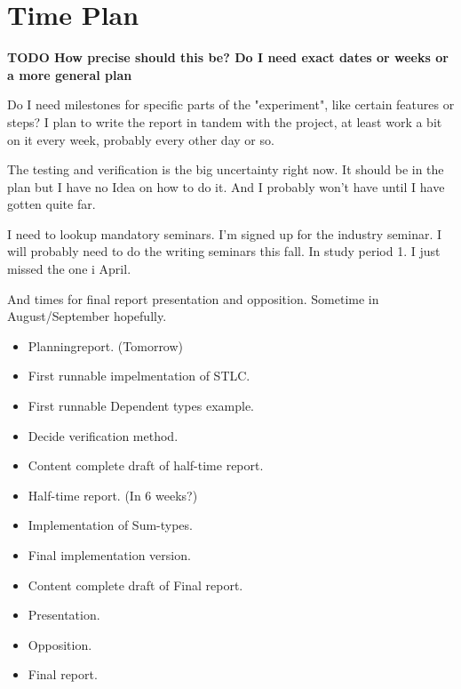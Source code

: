 \documentclass[parskip=half]{scrartcl}
\begin{document}
\section{Time Plan}
\textbf{TODO How precise should this be? Do I need exact dates or weeks or
a more general plan}


Do I need milestones for specific parts of the "experiment", like certain
features or steps? I plan to write the report in tandem with the project, at
least work a bit on it every week, probably every other day or so.

The testing and verification is the big uncertainty right now. It should be in
the plan but I have no Idea on how to do it. And I probably won't have until
I have gotten quite far.


I need to lookup mandatory seminars.
I'm signed up for the industry seminar.
I will probably need to do the writing seminars this fall. In study period 1.
I just missed the one i April.

And times for final report presentation and opposition.
Sometime in August/September hopefully.

\begin{itemize}
  \item Planningreport. (Tomorrow)
  \item First runnable impelmentation of STLC.
  \item First runnable Dependent types example.
  \item Decide verification method.
  \item Content complete draft of half-time report.
  \item Half-time report. (In 6 weeks?)
  \item Implementation of Sum-types.
  \item Final implementation version.
  \item Content complete draft of Final report.
  \item Presentation.
  \item Opposition.
  \item Final report.
\end{itemize}
\end{document}
